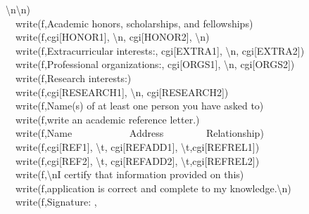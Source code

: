 {{{\textquotedbl}{\textbackslash}n{\textbackslash}n{\textquotedbl}) \\
\ \ write(f,{\textquotedbl}Academic honors, scholarships, and
fellowships{\textquotedbl}) \\
\ \ write(f,cgi[{\textquotedbl}HONOR1{\textquotedbl}],
{\textquotedbl}{\textbackslash}n{\textquotedbl},
cgi[{\textquotedbl}HONOR2{\textquotedbl}],
{\textquotedbl}{\textbackslash}n{\textquotedbl}) \\
\ \ write(f,{\textquotedbl}Extracurricular interests:{\textquotedbl}, cgi[{\textquotedbl}EXTRA1{\textquotedbl}],
{\textquotedbl}{\textbackslash}n{\textquotedbl},
cgi[{\textquotedbl}EXTRA2{\textquotedbl}]) \\
\ \ write(f,{\textquotedbl}Professional organizations:{\textquotedbl},
cgi[{\textquotedbl}ORGS1{\textquotedbl}],
{\textquotedbl}{\textbackslash}n{\textquotedbl},
cgi[{\textquotedbl}ORGS2{\textquotedbl}]) \\
\ \ write(f,{\textquotedbl}Research interests:{\textquotedbl}) \\
\ \ write(f,cgi[{\textquotedbl}RESEARCH1{\textquotedbl}],
{\textquotedbl}{\textbackslash}n{\textquotedbl},
cgi[{\textquotedbl}RESEARCH2{\textquotedbl}]) \\
\ \ write(f,{\textquotedbl}Name(s) of at least one person you have asked
to{\textquotedbl}) \\
\ \ write(f,{\textquotedbl}write an academic reference
letter.{\textquotedbl}) \\
\ \ write(f,{\textquotedbl}Name \ \ \ \ \ \ \ \ \ \ \ Address
\ \ \ \ \ \ \ \ Relationship{\textquotedbl}) \\
\ \ write(f,cgi[{\textquotedbl}REF1{\textquotedbl}],
{\textquotedbl}{\textbackslash}t{\textquotedbl},
cgi[{\textquotedbl}REFADD1{\textquotedbl}],
{\textquotedbl}{\textbackslash}t{\textquotedbl},cgi[{\textquotedbl}REFREL1{\textquotedbl}]) \\
\ \ write(f,cgi[{\textquotedbl}REF2{\textquotedbl}],
{\textquotedbl}{\textbackslash}t{\textquotedbl},
cgi[{\textquotedbl}REFADD2{\textquotedbl}],
{\textquotedbl}{\textbackslash}t{\textquotedbl},cgi[{\textquotedbl}REFREL2{\textquotedbl}]) \\
\ \ write(f,{\textquotedbl}{\textbackslash}nI certify that information
provided on this{\textquotedbl}) \\
\ \ write(f,{\textquotedbl}application is correct and complete to my
knowledge.{\textbackslash}n{\textquotedbl}) \\
\ \ write(f,{\textquotedbl}Signature: {\textquotedbl},
}}
